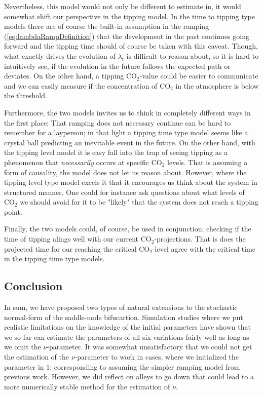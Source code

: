 Nevertheless, this model would not only be different to estimate in, it would somewhat shift our perspective in the tipping model. In the time to tipping type models there are of course the built-in assumption in the ramping (\ref{eq:lambdaRampDefinition}) that the development in the past continues going forward and the tipping time should of course be taken with this caveat. Though, what exactly drives the evolution of $\lambda_t$ is difficult to reason about, so it is hard to intuitively see, if the evolution in the future follows the expected path or deviates. 
On the other hand, a tipping $\mathrm{CO}_2$-value could be easier to communicate and we can easily measure if the concentration of $\mathrm{CO}_2$ in the atmosphere is below the threshold. 

Furthermore, the two models invites us to think in completely different ways in the first place: That ramping does not necessary continue can be hard to remember for a layperson; in that light a tipping time type model seems like a crystal ball predicting an inevitable event in the future. On the other hand, with the tipping level model it is easy fall into the trap of seeing tipping as a phenomenon that \textit{necessarily} occurs at specific $\mathrm{CO}_2$ levels. That is assuming a form of causality, the model does not let us reason about. However, where the tipping level type model excels it that it encourages us think about the system in structured manner. One could for instance ask questions about what levels of $\mathrm{CO}_2$ we should avoid for it to be "likely" that the system does not reach a tipping point. 

Finally, the two models could, of course, be used in conjunction; checking if the time of tipping alings well with our current $\mathrm{CO}_2$-projections. That is does the projected time for our reaching the critical $\mathrm{CO}_2$-level agree with the critical time in the tipping time type models.

\subsection{Conclusion}
In sum, we have proposed two types of natural extensions to the stochastic normal-form of the saddle-node bifucartion. Simulation studies where we put realistic limitations on the knowledge of the initial parameters have shown that we so far can estimate the parameters of all six variations fairly well as long as we omit the $\nu$-parameter. It was somewhat unsatisfactory that we could not get the estimation of the $\nu$-parameter to work in cases, where we initialized the parameter in $1$; corresponding to assuming the simpler ramping model from previous work. However, we did reflect on alleys to go down that could lead to a more numerically stable method for the estimation of $\nu$.

